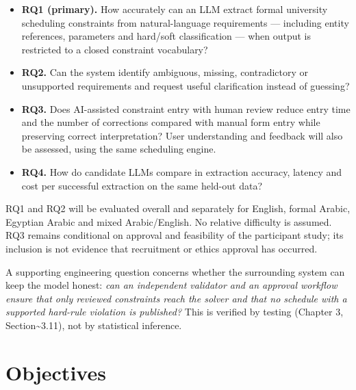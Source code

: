 \documentclass[
  11pt,a4paper,oneside]{report}
\providecommand{\tightlist}{%
  \setlength{\itemsep}{0pt}\setlength{\parskip}{0pt}}
\begin{document}
\begin{itemize}
\tightlist
\item
  \textbf{RQ1 (primary).} How accurately can an LLM extract formal
  university scheduling constraints from natural-language requirements
  --- including entity references, parameters and hard/soft
  classification --- when output is restricted to a closed constraint
  vocabulary?
\item
  \textbf{RQ2.} Can the system identify ambiguous, missing,
  contradictory or unsupported requirements and request useful
  clarification instead of guessing?
\item
  \textbf{RQ3.} Does AI-assisted constraint entry with human review
  reduce entry time and the number of corrections compared with manual
  form entry while preserving correct interpretation? User understanding and feedback will also be assessed, using the same scheduling engine.
\item
  \textbf{RQ4.} How do candidate LLMs compare in extraction accuracy,
  latency and cost per successful extraction on the same held-out data?
\end{itemize}

RQ1 and RQ2 will be evaluated overall and separately for English, formal Arabic, Egyptian Arabic and mixed Arabic/English. No relative difficulty is assumed. RQ3 remains conditional on approval and feasibility of the participant study; its inclusion is not evidence that recruitment or ethics approval has occurred.

A supporting engineering question concerns whether the surrounding
system can keep the model honest: \emph{can an independent validator and
an approval workflow ensure that only reviewed constraints reach the
solver and that no schedule with a supported hard-rule violation is
published?} This is verified by testing (Chapter 3,
Section\textasciitilde3.11), not by statistical inference.

\hypertarget{objectives}{%
\section{Objectives}\label{objectives}}
\end{document}
